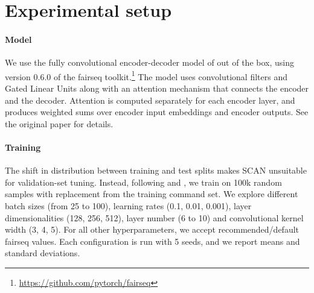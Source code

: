\fi



\section{Experimental setup}
\paragraph{Model} We use the fully convolutional encoder-decoder model
of  out of the box, using version 0.6.0 of the fairseq 
toolkit.\footnote{\url{https://github.com/pytorch/fairseq}} The model
uses convolutional filters and Gated Linear Units
\cite{dauphin:etal:2016} along with an attention mechanism
that connects the encoder and the decoder.  Attention is computed
separately for each encoder layer, and produces weighted sums over
encoder input embeddings and encoder outputs. See the original paper
for details.
\paragraph{Training} The shift in distribution between training and
test splits makes SCAN unsuitable for validation-set tuning. Instead,
following  and , we
train on 100k random samples with replacement from the
training command set. We explore different batch sizes (from
25 to 100), learning rates (0.1, 0.01, 0.001), layer dimensionalities
(128, 256, 512), layer number (6 to 10) and convolutional
kernel width (3, 4, 5). For all other hyperparameters, we accept recommended/default fairseq values. Each configuration is run with 5
 seeds, and we report means and standard deviations.




